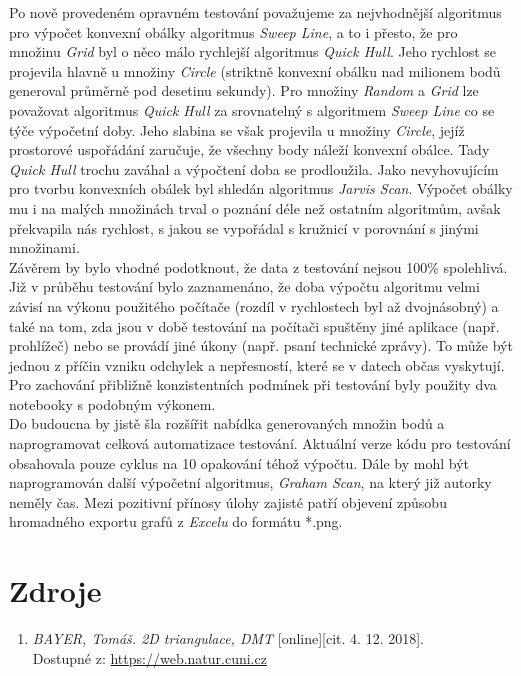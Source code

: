 \documentclass[a4paper, 12pt]{article}
\begin{document}
Po nově provedeném opravném testování považujeme za nejvhodnější algoritmus pro výpočet konvexní obálky algoritmus \textit{Sweep Line}, a to i přesto, že pro množinu \textit{Grid} byl o něco málo rychlejší algoritmus \textit{Quick Hull}. Jeho rychlost se projevila hlavně u množiny \textit{Circle} (striktně konvexní obálku nad milionem bodů generoval průměrně pod desetinu sekundy). Pro množiny \textit{Random} a \textit{Grid} lze považovat algoritmus \textit{Quick Hull} za srovnatelný s algoritmem \textit{Sweep Line} co se týče výpočetní doby. Jeho slabina se však projevila u množiny \textit{Circle}, jejíž prostorové uspořádání zaručuje, že všechny body náleží konvexní obálce. Tady \textit{Quick Hull} trochu zaváhal a výpočtení doba se prodloužila. Jako nevyhovujícím pro tvorbu konvexních obálek byl shledán algoritmus \textit{Jarvis Scan}. Výpočet obálky mu i na malých množinách trval o poznání déle než ostatním algoritmům, avšak překvapila nás rychlost, s jakou se vypořádal s kružnicí v porovnání s jinými množinami.\\

Závěrem by bylo vhodné podotknout, že data z testování nejsou 100\% spolehlivá. Již v průběhu testování bylo zaznamenáno, že doba výpočtu algoritmu velmi závisí na výkonu použitého počítače (rozdíl v rychlostech byl až dvojnásobný) a také na tom, zda jsou v době testování na počítači spuštěny jiné aplikace (např. prohlížeč) nebo se provádí jiné úkony (např. psaní technické zprávy). To může být jednou z příčin vzniku odchylek a nepřesností, které se v datech občas vyskytují. Pro zachování přibližně konzistentních podmínek při testování byly použity dva notebooky s podobným výkonem.\\

Do budoucna by jistě šla rozšířit nabídka generovaných množin bodů a naprogramovat celková automatizace testování. Aktuální verze kódu pro testování obsahovala pouze cyklus na 10 opakování téhož výpočtu. Dále by mohl být naprogramován další výpočetní algoritmus, \textit{Graham Scan}, na který již autorky neměly čas. Mezi pozitivní přínosy úlohy zajisté patří objevení způsobu hromadného exportu grafů z \textit{Excelu} do formátu *.png.

\clearpage

\section{Zdroje}
\begin{enumerate}
\item  \textsl{BAYER, Tomáš. 2D triangulace, DMT} [online][cit. 4. 12. 2018].\\
Dostupné z: \href{https://web.natur.cuni.cz/~bayertom/images/courses/Adk/adk5.pdf}{https://web.natur.cuni.cz}



\end{enumerate}
\end{document}
